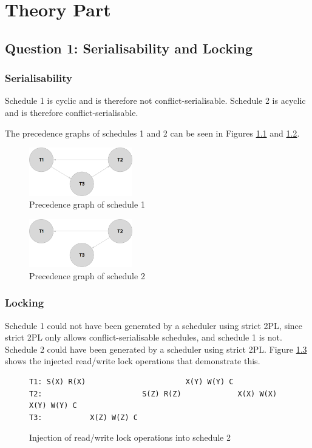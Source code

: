 \chapter{Theory Part}

\section{Question 1: Serialisability and Locking}

\subsection{Serialisability}
Schedule 1 is cyclic and is therefore not conflict-serialisable. Schedule 2 is acyclic and is therefore conflict-serialisable.

The precedence graphs of schedules 1 and 2 can be seen in Figures \ref{precedencegraph1} and \ref{precedencegraph2}.

\begin{figure}[H]
    \centering
    \includegraphics[width=0.4\textwidth]{schedule1.png}
    \caption{Precedence graph of schedule 1 \label{precedencegraph1}}
\end{figure}

\begin{figure}[H]
    \centering
    \includegraphics[width=0.4\textwidth]{schedule2.png}
    \caption{Precedence graph of schedule 2 \label{precedencegraph2}}
\end{figure}

\subsection{Locking}

Schedule 1 could not have been generated by a scheduler using strict 2PL, since strict 2PL only allows conflict-serialisable schedules, and schedule 1 is not.
Schedule 2 could have been generated by a scheduler using strict 2PL. Figure \ref{schedule2strict2pl} shows the injected read/write lock operations that demonstrate this.

\begin{figure}
\begin{verbatim}
T1: S(X) R(X)                       X(Y) W(Y) C
T2:                       S(Z) R(Z)             X(X) W(X) X(Y) W(Y) C
T3:           X(Z) W(Z) C
\end{verbatim}
\caption{Injection of read/write lock operations into schedule 2\label{schedule2strict2pl}}
\end{figure}
